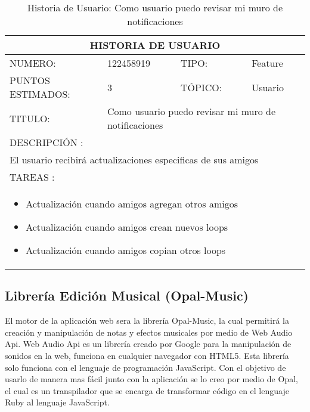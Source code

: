 \begin{table}[h]
\centering
\renewcommand{\arraystretch}{1.4}
\begin{tabular}{|*{4}{l|}}
\hline
\multicolumn{4}{|c|}{HISTORIA DE USUARIO} \\ \hline
NUMERO: & 122458919 & TIPO: & Feature \\ \hline
PUNTOS ESTIMADOS: & 3 & TÓPICO: & Usuario \\ \hline
TITULO: & \multicolumn{3}{|p{7.2cm}|}{Como usuario puedo revisar mi muro de notificaciones} \\ \hline
\multicolumn{4}{|l|}{DESCRIPCIÓN : } \\ \hline
\multicolumn{4}{p{11cm}}{El usuario recibirá actualizaciones especificas de sus amigos} \\ \hline
\multicolumn{4}{|l|}{TAREAS : } \\ \hline
\multicolumn{4}{|p{11cm}|}{
\begin{minipage}[t]{\hsize}
  \begin{itemize}
    \item Actualización cuando amigos agregan otros amigos
    \item Actualización cuando amigos crean nuevos loops
    \item Actualización cuando amigos copian otros loops
  \end{itemize}
\end{minipage}
} \\ \hline
\end{tabular}
\caption{Historia de Usuario: Como usuario puedo revisar mi muro de notificaciones}
\label{tab:Primero}
\end{table}

\subsection{Librería Edición Musical (Opal-Music)}

El motor de la aplicación web sera la librería Opal-Music, la cual permitirá la creación
y manipulación de notas y efectos musicales por medio de Web Audio Api.
Web Audio Api es un librería creado por Google para la manipulación de
sonidos en la web, funciona en cualquier navegador con HTML5.
Esta librería solo funciona con el lenguaje de programación JavaScript.
Con el objetivo de usarlo de manera mas fácil junto con la aplicación se lo creo
por medio de Opal, el cual es un transpilador que se encarga de transformar
código en el lenguaje Ruby al lenguaje JavaScript.

